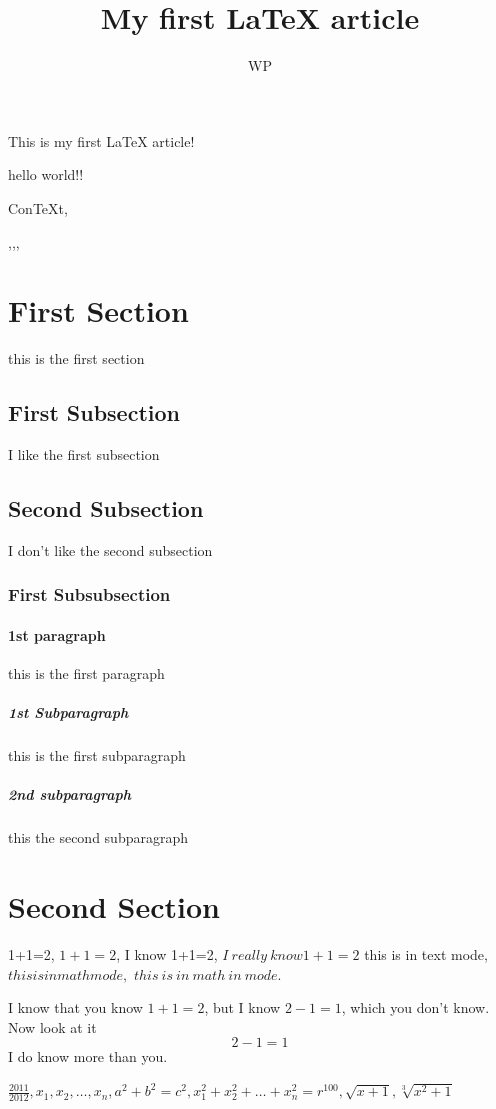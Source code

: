 \documentclass{article}
\author{WP}
\title{My first \LaTeX{} article}
\begin{document}
    \maketitle

    This is my first \LaTeX{} article!

    hello world!!

    Con\TeX{}t,

    \METAFONT,\MF,\quad,\MP

    \section{First Section}
    this is the first section
    \subsection{First Subsection}
    I like the first subsection
    \subsection{Second Subsection}
    I don't like the second subsection
    \subsubsection{First Subsubsection}
    \paragraph{1st paragraph}
    this is the first paragraph
    \subparagraph{1st Subparagraph}
    this is the first subparagraph
    \subparagraph{2nd subparagraph}
    this the second subparagraph

    \section{Second Section}
    1+1=2, $1+1=2$, I know 1+1=2, $I\ really\ know 1+1=2$
    this is in text mode, $this is in math mode,$ $this\ is\ in\ math\ in\ mode.$

    I know that you know $1+1=2$, but I know $2-1=1$, which you don't know. Now look at it $$2-1=1$$ I do know more than you.

    $\frac{2011}{2012}, x_1,x_2,\ldots,x_n, a^2+b^2=c^2, x_1^2+x_2^2+\dots+x_n^2=r^{100}, \sqrt{x+1}, \sqrt[3]{x^2+1}$
\end{document}
